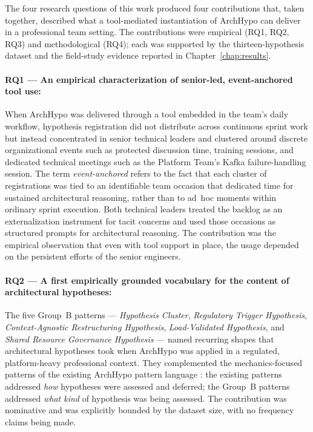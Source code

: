 The four research questions of this work produced four contributions that,
taken together, described what a tool-mediated instantiation of ArchHypo can
deliver in a professional team setting. The contributions were empirical (RQ1, RQ2, RQ3) and methodological (RQ4); each
was supported by the thirteen-hypothesis dataset and the field-study evidence
reported in Chapter~\ref{chap:results}.

\paragraph{RQ1 --- An empirical characterization of senior-led,
event-anchored tool use:} When ArchHypo was delivered through a tool embedded
in the team's daily workflow, hypothesis registration did not distribute
across continuous sprint work but instead concentrated in senior technical
leaders and clustered around discrete organizational events such as protected
discussion time, training sessions, and dedicated technical meetings such as
the Platform Team's Kafka failure-handling session. The term \emph{event-anchored} 
refers to the fact that each cluster of registrations was tied to an
identifiable team occasion that dedicated time for sustained architectural reasoning,
rather than to ad~hoc moments within ordinary sprint execution. Both
technical leaders treated the backlog as an externalization instrument for
tacit concerns and used those occasions as structured prompts for
architectural reasoning. The contribution was the empirical observation that
even with tool support in place, the usage depended on the persistent efforts 
of the senior engineers.

\paragraph{RQ2 --- A first empirically grounded vocabulary for the content of
architectural hypotheses:} The five Group~B patterns --- \textit{Hypothesis
Cluster}, \textit{Regulatory Trigger Hypothesis}, \textit{Context-Agnostic Restructuring
Hypothesis}, \textit{Load-Validated Hypothesis}, and \textit{Shared Resource
Governance Hypothesis} --- named recurring shapes that architectural
hypotheses took when ArchHypo was applied in a regulated, platform-heavy
professional context. They complemented the mechanics-focused patterns of the
existing ArchHypo pattern language \citep{silva2024patterns}: the existing
patterns addressed \emph{how} hypotheses were assessed and deferred; the
Group~B patterns addressed \emph{what kind} of hypothesis was being
assessed. The contribution was nominative and was explicitly bounded by
the dataset size, with no frequency claims being made.

